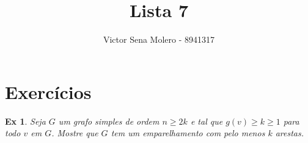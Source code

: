 \documentclass[12pt]{article}
\newcounter{exCounter}
\newtheorem{ex}[exCounter]{Ex}
\begin{document}
 
 
\title{Lista 7}
\author{Victor Sena Molero - 8941317}
\maketitle

\section{Exercícios}
\begin{ex}
Seja $G$ um grafo simples de ordem $n \geq 2k$ e tal que $g(v) \geq k \geq 1$ para todo $v$ em $G$. Mostre que $G$ tem um emparelhamento com pelo menos $k$ arestas.
\end{ex}
\end{document}
